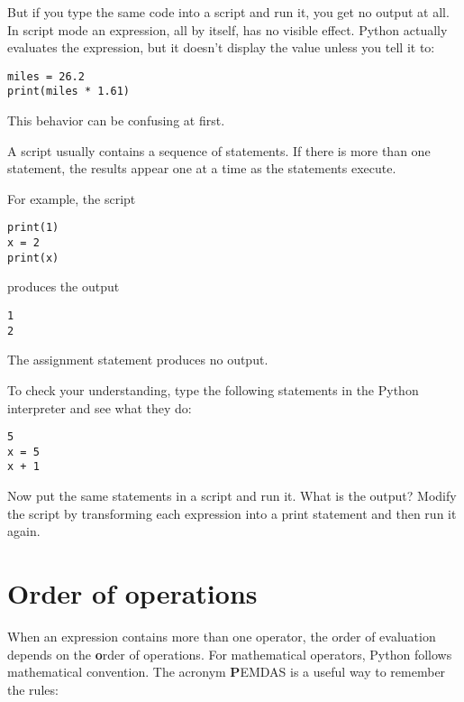 \documentclass[
DIV=11,
fontsize=12,
twoside,
headinclude=false,
titlepage=firstiscover,
abstract=true,
headsepline=true,
footsepline=true,
chapterprefix=true, %
headings=big,
bibliography=totoc,%
captions=tableheading
]{scrbook}
\theoremstyle{definition}
\begin{document}
But if you type the same code into a script and run it, you get no
output at all.  In script mode an expression, all by itself, has no
visible effect.  Python actually evaluates the expression, but it doesn't
display the value unless you tell it to:

\begin{lstlisting}
miles = 26.2
print(miles * 1.61)
\end{lstlisting}

This behavior can be confusing at first.

A script usually contains a sequence of statements.  If there
is more than one statement, the results appear one at a time
as the statements execute.

For example, the script

\begin{lstlisting}
print(1)
x = 2
print(x)
\end{lstlisting}
%
produces the output

\begin{lstlisting}
1
2
\end{lstlisting}
%
The assignment statement produces no output.

To check your understanding, type the following statements in the
Python interpreter and see what they do:

\begin{lstlisting}
5
x = 5
x + 1
\end{lstlisting}

Now put the same statements in a script and run it.  What
is the output?  Modify the script by transforming each
expression into a print statement and then run it again.



\section{Order of operations}

When an expression contains more than one operator, the order of
evaluation depends on the {\textbf order of operations}.  For
mathematical operators, Python follows mathematical convention.
The acronym {\textbf PEMDAS} is a useful way to
remember the rules:
\end{document}
